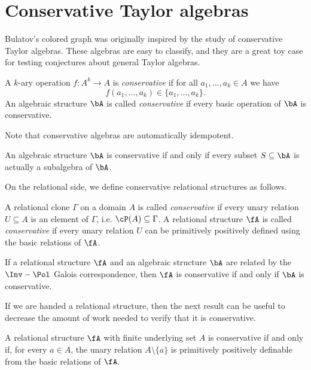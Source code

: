 

\section{Conservative Taylor algebras}

Bulatov's colored graph was originally inspired by the study of conservative Taylor algebras. These algebras are easy to classify, and they are a great toy case for testing conjectures about general Taylor algebras.

\begin{defn} A $k$-ary operation $f : A^k \rightarrow A$ is \emph{conservative} if for all $a_1, ..., a_k \in A$ we have
\[
f(a_1, ..., a_k) \in \{a_1, ..., a_k\}.
\]
An algebraic structure $\bA$ is called \emph{conservative} if every basic operation of $\bA$ is conservative.
\end{defn}

Note that conservative algebras are automatically idempotent.

\begin{prop} An algebraic structure $\bA$ is conservative if and only if every subset $S \subseteq \bA$ is actually a subalgebra of $\bA$.
\end{prop}

On the relational side, we define conservative relational structures as follows.

\begin{defn} A relational clone $\Gamma$ on a domain $A$ is called \emph{conservative} if every unary relation $U \subseteq A$ is an element of $\Gamma$, i.e. $\cP(A) \subseteq \Gamma$. A relational structure $\fA$ is called \emph{conservative} if every unary relation $U$ can be primitively positively defined using the basic relations of $\fA$.
\end{defn}

\begin{prop} If a relational structure $\fA$ and an algebraic structure $\bA$ are related by the $\Inv-\Pol$ Galois correspondence, then $\fA$ is conservative if and only if $\bA$ is conservative.
\end{prop}

If we are handed a relational structure, then the next result can be useful to decrease the amount of work needed to verify that it is conservative.

\begin{prop} A relational structure $\fA$ with finite underlying set $A$ is conservative if and only if, for every $a \in A$, the unary relation $A \setminus \{a\}$ is primitively positively definable from the basic relations of $\fA$.
\end{prop}

